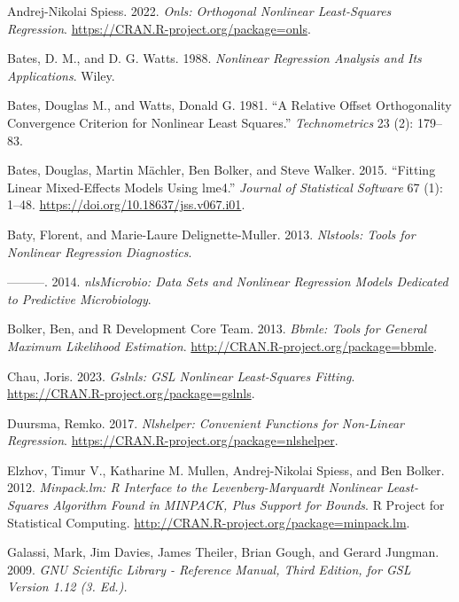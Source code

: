 \label{refs}
\setlength{\cslentryspacing}{0em}
\begin{CSLReferences}
Andrej-Nikolai Spiess. 2022. \emph{Onls: Orthogonal Nonlinear Least-Squares Regression}. \url{https://CRAN.R-project.org/package=onls}.

Bates, D. M., and D. G. Watts. 1988. \emph{Nonlinear Regression Analysis and Its Applications}. Wiley.

Bates, Douglas M., and Watts, Donald G. 1981. {``A Relative Offset Orthogonality Convergence Criterion for Nonlinear Least Squares.''} \emph{Technometrics} 23 (2): 179--83.

Bates, Douglas, Martin Mächler, Ben Bolker, and Steve Walker. 2015. {``Fitting Linear Mixed-Effects Models Using {lme4}.''} \emph{Journal of Statistical Software} 67 (1): 1--48. \url{https://doi.org/10.18637/jss.v067.i01}.

Baty, Florent, and Marie-Laure Delignette-Muller. 2013. \emph{Nlstools: Tools for Nonlinear Regression Diagnostics}.

---------. 2014. \emph{nlsMicrobio: Data Sets and Nonlinear Regression Models Dedicated to Predictive Microbiology}.

Bolker, Ben, and R Development Core Team. 2013. \emph{Bbmle: Tools for General Maximum Likelihood Estimation}. \url{http://CRAN.R-project.org/package=bbmle}.

Chau, Joris. 2023. \emph{Gslnls: GSL Nonlinear Least-Squares Fitting}. \url{https://CRAN.R-project.org/package=gslnls}.

Duursma, Remko. 2017. \emph{Nlshelper: Convenient Functions for Non-Linear Regression}. \url{https://CRAN.R-project.org/package=nlshelper}.

Elzhov, Timur V., Katharine M. Mullen, Andrej-Nikolai Spiess, and Ben Bolker. 2012. \emph{Minpack.lm: R Interface to the Levenberg-Marquardt Nonlinear Least-Squares Algorithm Found in MINPACK, Plus Support for Bounds}. R Project for Statistical Computing. \url{http://CRAN.R-project.org/package=minpack.lm}.

Galassi, Mark, Jim Davies, James Theiler, Brian Gough, and Gerard Jungman. 2009. \emph{GNU Scientific Library - Reference Manual, Third Edition, for GSL Version 1.12 (3. Ed.).}


\end{CSLReferences}
